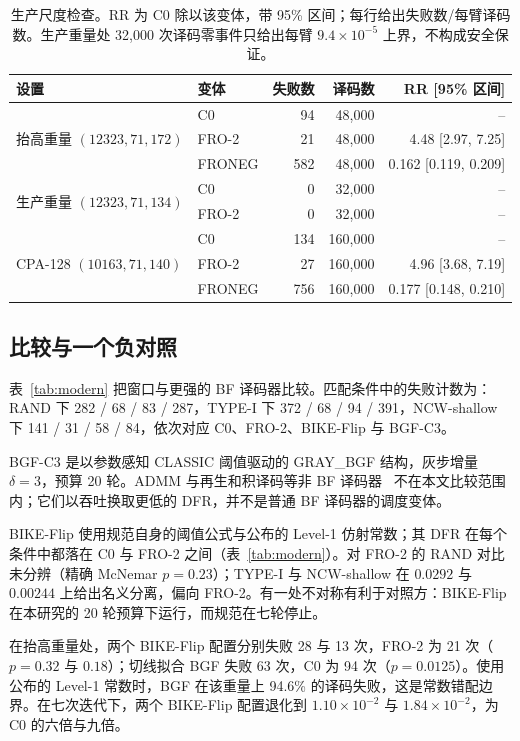 \documentclass[UTF8,a4paper,10pt,twocolumn]{ctexart}
\begin{document}
\begin{table}[!t]
\centering
\small
\caption{生产尺度检查。RR 为 C0 除以该变体，带 95\% 区间；每行给出失败数/每臂译码数。生产重量处 32{,}000 次译码零事件只给出每臂 $9.4\times10^{-5}$ 上界，不构成安全保证。}
\label{tab:added}
\begin{tabular}{llrrr}
\toprule
设置 & 变体 & 失败数 & 译码数 & RR [95\% 区间] \\
\midrule
\multirow{3}{*}{抬高重量 $(12323,71,172)$} & C0 & 94 & 48{,}000 & -- \\
 & FRO-2 & 21 & 48{,}000 & 4.48 [2.97, 7.25] \\
 & FRONEG & 582 & 48{,}000 & 0.162 [0.119, 0.209] \\
\midrule
\multirow{2}{*}{生产重量 $(12323,71,134)$} & C0 & 0 & 32{,}000 & -- \\
 & FRO-2 & 0 & 32{,}000 & -- \\
\midrule
\multirow{3}{*}{CPA-128 $(10163,71,140)$} & C0 & 134 & 160{,}000 & -- \\
 & FRO-2 & 27 & 160{,}000 & 4.96 [3.68, 7.19] \\
 & FRONEG & 756 & 160{,}000 & 0.177 [0.148, 0.210] \\
\bottomrule
\end{tabular}
\end{table}

\subsection{比较与一个负对照}\label{sec:modern}

表~\ref{tab:modern} 把窗口与更强的 BF 译码器比较。匹配条件中的失败计数为：RAND 下 282 / 68 / 83 / 287，TYPE-I 下 372 / 68 / 94 / 391，NCW-shallow 下 141 / 31 / 58 / 84，依次对应 C0、FRO-2、BIKE-Flip 与 BGF-C3。

BGF-C3 是以参数感知 CLASSIC 阈值驱动的 GRAY\_BGF 结构，灰步增量 $\delta=3$，预算 20 轮。ADMM 与再生和积译码等非 BF 译码器~\cite{watanabe2024admm} 不在本文比较范围内；它们以吞吐换取更低的 DFR，并不是普通 BF 译码器的调度变体。

BIKE-Flip 使用规范自身的阈值公式与公布的 Level-1 仿射常数；其 DFR 在每个条件中都落在 C0 与 FRO-2 之间（表~\ref{tab:modern}）。对 FRO-2 的 RAND 对比未分辨（精确 McNemar $p=0.23$）；TYPE-I 与 NCW-shallow 在 $0.0292$ 与 $0.00244$ 上给出名义分离，偏向 FRO-2。有一处不对称有利于对照方：BIKE-Flip 在本研究的 20 轮预算下运行，而规范在七轮停止。

在抬高重量处，两个 BIKE-Flip 配置分别失败 28 与 13 次，FRO-2 为 21 次（$p=0.32$ 与 $0.18$）；切线拟合 BGF 失败 63 次，C0 为 94 次（$p=0.0125$）。使用公布的 Level-1 常数时，BGF 在该重量上 94.6\% 的译码失败，这是常数错配边界。在七次迭代下，两个 BIKE-Flip 配置退化到 $1.10\times10^{-2}$ 与 $1.84\times10^{-2}$，为 C0 的六倍与九倍。
\end{document}
